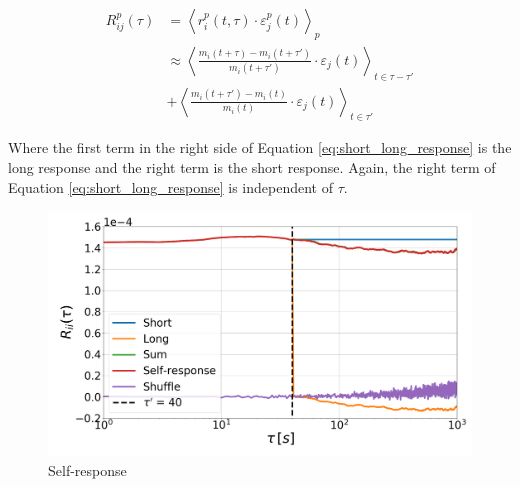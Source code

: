 \begin{align}\label{eq:short_long_response}
    R^{p}_{ij}\left(\tau\right)&=\left\langle r^{p}_{i}\left(t, \tau\right)
    \cdot\varepsilon^{p}_{j}\left(t\right)\right\rangle _{p} \nonumber \\
    &\approx\left\langle \frac{m_{i}\left(t+\tau\right)-m_{i}
    \left(t+\tau'\right)} {m_{i}\left(t+\tau'\right)}\cdot\varepsilon_{j}
    \left(t\right)\right\rangle _{t\in\tau-\tau'} \nonumber \\
    & +\left\langle \frac{m_{i}
    \left(t+\tau'\right)-m_{i}\left(t\right)}{m_{i}\left(t\right)}
    \cdot\varepsilon_{j}\left(t\right)\right\rangle _{t\in\tau'}
\end{align}

Where the first term in the right side of Equation \ref{eq:short_long_response}
is the long response and the right term is the short response. Again, the right
term of Equation \ref{eq:short_long_response} is independent of $\tau$.

\begin{figure}[htbp]
    \centering
    \includegraphics[width=\columnwidth]{figures/05_self_short_long_AAPL.png}
    \caption{Self-response}
    \label{fig:short_long_self-response}
\end{figure}


